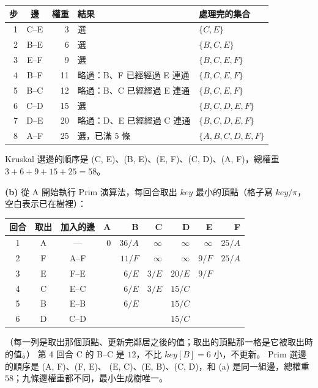 \begin{center}
\small
\begin{tabular}{rcrll}
\toprule
步 & 邊 & 權重 & 結果 & 處理完的集合 \\
\midrule
1 & C--E & 3 & 選 & $\{C, E\}$ \\
2 & B--E & 6 & 選 & $\{B, C, E\}$ \\
3 & E--F & 9 & 選 & $\{B, C, E, F\}$ \\
4 & B--F & 11 & 略過：B、F 已經經過 E 連通 & $\{B, C, E, F\}$ \\
5 & B--C & 12 & 略過：B、C 已經經過 E 連通 & $\{B, C, E, F\}$ \\
6 & C--D & 15 & 選 & $\{B, C, D, E, F\}$ \\
7 & D--E & 20 & 略過：D、E 已經經過 C 連通 & $\{B, C, D, E, F\}$ \\
8 & A--F & 25 & 選，已滿 $5$ 條 & $\{A, B, C, D, E, F\}$ \\
\bottomrule
\end{tabular}
\end{center}

Kruskal 選邊的順序是 (C, E)、(B, E)、(E, F)、(C, D)、(A, F)，總權重
$3 + 6 + 9 + 15 + 25 = 58$。

\textbf{(b)} 從 A 開始執行 Prim 演算法，每回合取出 $\mathit{key}$ 最小的頂點（格子寫
$\mathit{key}/\pi$，空白表示已在樹裡）：

\begin{center}
\small
\begin{tabular}{cccrrrrrr}
\toprule
回合 & 取出 & 加入的邊 & A & B & C & D & E & F \\
\midrule
1 & A & — & $0$ & $36/A$ & $\infty$ & $\infty$ & $\infty$ & $25/A$ \\
2 & F & A--F & & $11/F$ & $\infty$ & $\infty$ & $9/F$ & $25/A$ \\
3 & E & F--E & & $6/E$ & $3/E$ & $20/E$ & $9/F$ & \\
4 & C & E--C & & $6/E$ & $3/E$ & $15/C$ & & \\
5 & B & E--B & & $6/E$ & & $15/C$ & & \\
6 & D & C--D & & & & $15/C$ & & \\
\bottomrule
\end{tabular}
\end{center}

（每一列是取出那個頂點、更新完鄰居之後的值；取出的頂點那一格是它被取出時的值。） 第 4 回合
C 的 B--C 是 $12$，不比 $\mathit{key}[B] = 6$ 小，不更新。 Prim 選邊的順序是 (A, F)、(F, E)、
(E, C)、(E, B)、(C, D)，和 (a) 是同一組邊，總權重 $58$；九條邊權重都不同，最小生成樹唯一。

